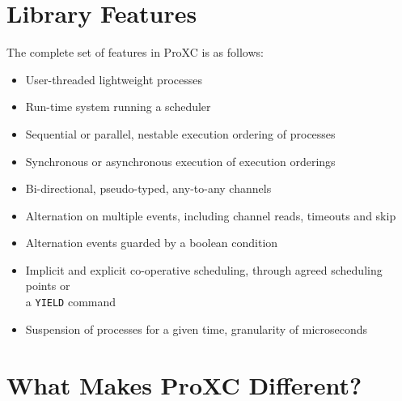 \section{Library Features}
\label{sec:proxc_features}

The complete set of features in ProXC is as follows:
\begin{itemize}
    \item User\hyp{}threaded lightweight processes
    \item Run\hyp{}time system running a scheduler
    \item Sequential or parallel, nestable execution ordering of processes
    \item Synchronous or asynchronous execution of execution orderings
    \item Bi\hyp{}directional, pseudo\hyp{}typed, any\hyp{}to\hyp{}any channels
    \item Alternation on multiple events, including channel reads, timeouts and skip
    \item Alternation events guarded by a boolean condition
    \item Implicit and explicit co\hyp{}operative scheduling, through agreed scheduling points or\\ a \texttt{YIELD} command
    \item Suspension of processes for a given time, granularity of microseconds
\end{itemize}

\section{What Makes ProXC Different?}
\label{sec:proxc_difference}



